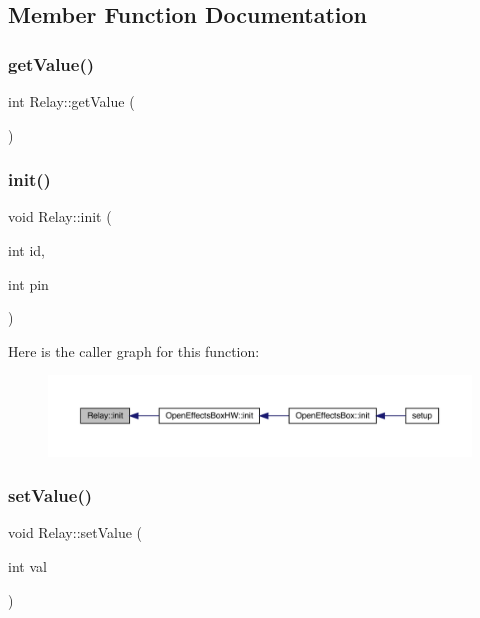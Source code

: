 \subsection{Member Function Documentation}
\mbox{\label{class_relay_a79282f246d1314dbd8d1935dbe7dfe44}} 
\subsubsection{\texorpdfstring{get\+Value()}{getValue()}}
{\footnotesize\ttfamily int Relay\+::get\+Value (\begin{DoxyParamCaption}{ }\end{DoxyParamCaption})}

\mbox{\label{class_relay_af8403e742823980f606c09e9508cbf07}} 
\subsubsection{\texorpdfstring{init()}{init()}}
{\footnotesize\ttfamily void Relay\+::init (\begin{DoxyParamCaption}\item[{int}]{id,  }\item[{int}]{pin }\end{DoxyParamCaption})}

Here is the caller graph for this function\+:\nopagebreak
\begin{figure}[H]
\begin{center}
\leavevmode
\includegraphics[width=350pt]{class_relay_af8403e742823980f606c09e9508cbf07_icgraph}
\end{center}
\end{figure}
\mbox{\label{class_relay_ad503697efacdaeb980a9e580a3ae8def}} 
\subsubsection{\texorpdfstring{set\+Value()}{setValue()}}
{\footnotesize\ttfamily void Relay\+::set\+Value (\begin{DoxyParamCaption}\item[{int}]{val }\end{DoxyParamCaption})}

